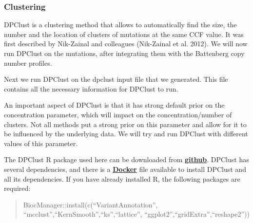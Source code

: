 \documentclass[]{article}
\begin{document}
\hypertarget{clustering}{%
\subsubsection{Clustering}\label{clustering}}

DPClust is a clustering method that allows to automatically find the
size, the number and the location of clusters of mutations at the same
CCF value. It was first described by Nik-Zainal and colleagues
(Nik-Zainal et al. 2012). We will now run DPClust on the mutations,
after integrating them with the Battenberg copy number profiles.

Next we run DPClust on the dpclust input file that we generated. This
file contains all the necessary information for DPClust to run.

An important aspect of DPClust is that it has strong default prior on
the concentration parameter, which will impact on the
concentration/number of clusters. Not all methods put a strong prior on
this parameter and allow for it to be influenced by the underlying data.
We will try and run DPClust with different values of this parameter.

The DPClust R package used here can be downloaded from
\href{https://github.com/Wedge-Oxford/dpclust_smchet_docker/blob/master/dpclust_v2.2.5.tar.gz}{\textbf{github}}.
DPClust has several dependencies, and there is a
\href{https://github.com/Wedge-Oxford/dpclust_smchet_docker/blob/master/Dockerfile}{\textbf{Docker}}
file available to install DPClust and all its dependencies. If you have
already installed R, the following packages are required:

\begin{quote}
BiocManager::install(c(``VariantAnnotation'',
``mcclust'',``KernSmooth'',``ks'',``lattice'',
``ggplot2'',``gridExtra'',``reshape2''))
\end{quote}
\end{document}
